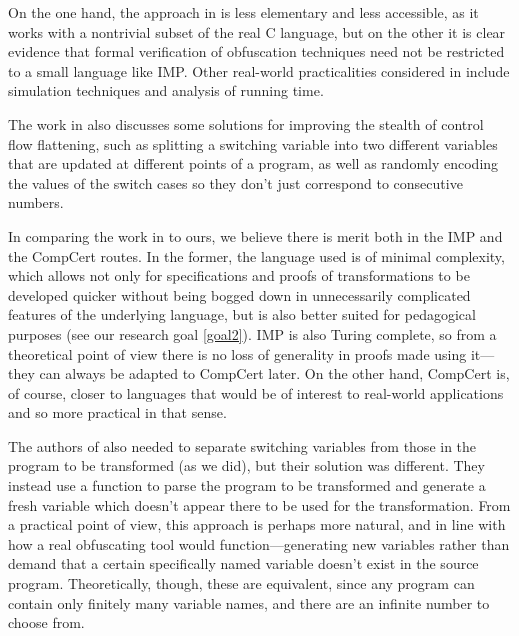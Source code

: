 \documentclass[compsoc,conference,a4paper,10pt,times]{IEEEtran}
\begin{document}
On the one hand, the approach in \cite{Blazy2} is less elementary and less accessible, as it works with a nontrivial subset of the real C language, but on the other it is clear evidence that formal verification of obfuscation techniques need not be restricted to a small language like IMP. Other real-world practicalities considered in \cite{Blazy2} include simulation techniques and analysis of running time.

The work in \cite{Blazy2} also discusses some solutions for improving the stealth of control flow flattening, such as splitting a switching variable into two different variables that are updated at different points of a program, as well as randomly encoding the values of the switch cases so they don't just correspond to consecutive numbers.  %

In comparing the work in \cite{Blazy2} to ours, we believe there is merit both in the IMP and the CompCert routes.  In the former, the language used is of minimal complexity, which allows not only for specifications and proofs of transformations to be developed quicker without being bogged down in unnecessarily complicated features of the underlying language, but is also better suited for pedagogical purposes (see our research goal \ref{goal2}). IMP is also Turing complete, so from a theoretical point of view there is no loss of generality in proofs made using it---they can always be adapted to CompCert later.  On the other hand, CompCert is, of course, closer to languages that would be of interest to real-world applications and so more practical in that sense.

The authors of \cite{Blazy2} also 
needed to separate switching variables from those in the program to be transformed (as we did), but their solution was different. They instead use a function to parse the program to be transformed and generate a fresh variable which doesn't appear there to be used for the transformation.  From a practical point of view, this approach is perhaps more natural, and in line with how a real obfuscating tool would function---generating new variables rather than demand that a certain specifically named variable doesn't exist in the source program.  Theoretically, though, these are equivalent, since any program can contain only finitely many variable names, and there are an infinite number to choose from.
\end{document}
